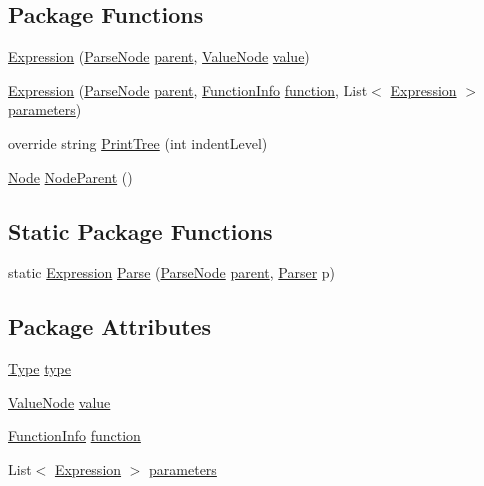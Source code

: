 \subsection*{Package Functions}
\begin{DoxyCompactItemize}
\item 
\hyperlink{a00040_a91f0536300ebb39eaf9b7526c7e97364}{Expression} (\hyperlink{a00063}{Parse\-Node} \hyperlink{a00063_af313a82103fcc2ff5a177dbb06b92f7b}{parent}, \hyperlink{a00087}{Value\-Node} \hyperlink{a00040_a569e516782891544c334ff8131b23108}{value})
\item 
\hyperlink{a00040_ac2a8b8fd554b8006b5e2f1d1ca3cf93e}{Expression} (\hyperlink{a00063}{Parse\-Node} \hyperlink{a00063_af313a82103fcc2ff5a177dbb06b92f7b}{parent}, \hyperlink{a00041}{Function\-Info} \hyperlink{a00040_a9c1859ce5ad4c86ded8dd0d61da61320}{function}, List$<$ \hyperlink{a00040}{Expression} $>$ \hyperlink{a00040_a7b21380bead8ae08b2cfc6594edab32c}{parameters})
\item 
override string \hyperlink{a00040_a509ba6d93218203bae56a5a7a82e8261}{Print\-Tree} (int indent\-Level)
\item 
\hyperlink{a00054}{Node} \hyperlink{a00063_a580e520a29444fc23ac3660cbe514a09}{Node\-Parent} ()
\end{DoxyCompactItemize}
\subsection*{Static Package Functions}
\begin{DoxyCompactItemize}
\item 
static \hyperlink{a00040}{Expression} \hyperlink{a00040_a686da57aaf67d50d2832f9ee0028a979}{Parse} (\hyperlink{a00063}{Parse\-Node} \hyperlink{a00063_af313a82103fcc2ff5a177dbb06b92f7b}{parent}, \hyperlink{a00064}{Parser} p)
\end{DoxyCompactItemize}
\subsection*{Package Attributes}
\begin{DoxyCompactItemize}
\item 
\hyperlink{a00040_aceddb5496ccffe668bced2d131e4bf86}{Type} \hyperlink{a00040_ad55c92df835006328bc2a79a8f91efb9}{type}
\item 
\hyperlink{a00087}{Value\-Node} \hyperlink{a00040_a569e516782891544c334ff8131b23108}{value}
\item 
\hyperlink{a00041}{Function\-Info} \hyperlink{a00040_a9c1859ce5ad4c86ded8dd0d61da61320}{function}
\item 
List$<$ \hyperlink{a00040}{Expression} $>$ \hyperlink{a00040_a7b21380bead8ae08b2cfc6594edab32c}{parameters}
\end{DoxyCompactItemize}
